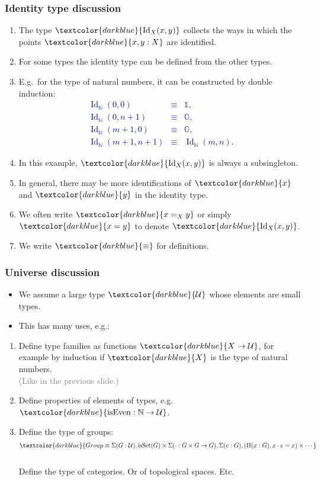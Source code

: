 \documentclass[aspectratio=169]{beamer}
\newcommand{\isSet}{\operatorname{isSet}}
\newcommand{\eqq}{\equiv}
\newcommand{\U}{\operatorname{\mathcal{U}}}
\newcommand{\db}{\textcolor{darkblue}}
\newcommand{\grey}{\textcolor{grey}}
\newcommand{\m}[1]{$\db{#1}$}
\newcommand{\M}[1]{\[\db{#1}\]}
\newcommand{\N}{\mathbb{N}}
\newcommand{\Id}{\operatorname{Id}}
\begin{document}
\begin{frame}
  \frametitle{Identity type discussion}

  \begin{enumerate}
\vfill \item The type \m{\Id_X(x,y)} collects the ways in which the points \m{x,y:X} are identified.
  \vfill \item For some types the identity type can be defined from the other types.
  \vfill \item E.g.\ for the type of natural numbers, it can be constructed by double induction:
  \db{\begin{eqnarray*}
    \Id_\N(0,0) & \eqq & \mathbb{1}, \\
    \Id_\N(0,n+1) & \eqq & \mathbb{O}, \\
    \Id_\N(m+1,0) & \eqq & \mathbb{O}, \\
    \Id_\N(m+1,n+1) & \eqq & \Id_\N(m,n).
  \end{eqnarray*}}

  \vspace*{-4ex}

  \vfill \item In this example, \m{\Id_X(x,y)} is always a subsingleton.
  \vfill \item In general, there may be more identifications of \m{x} and \m{y} in the identity type.
  \vfill \item We often write \m{x =_X y} or simply \m{x = y} to denote \m{\Id_X(x,y)}.
  \vfill \item We write \m{\eqq} for definitions.
  \end{enumerate}

\end{frame}


\begin{frame}
  \frametitle{Universe discussion}

  \begin{itemize}
  \vfill \item We assume a large type \m{\U} whose elements are small types.
\vfill \item This has many uses, e.g.:
  \end{itemize}
\begin{enumerate}
\vfill \item Define type families as functions \m{X \to \U}, for example by induction if \m{X} is the type of natural numbers. \\[1ex]
\grey{(Like in the previous slide.)}
\vfill \item Define properties of elements of types, e.g. \m{\operatorname{isEven} : \N \to \U}.
\vfill \item Define the type of groups:
\M{Group \eqq \Sigma(G:\U), \isSet(G) \times \Sigma(\cdot : G \times G \to G), \Sigma(e:G), (\Pi(x:G), x \cdot e = x) \times \cdots} \\[1ex]
Define the type of categories. Or of topological spaces.
Etc.
\end{enumerate}

\end{frame}
\end{document}
